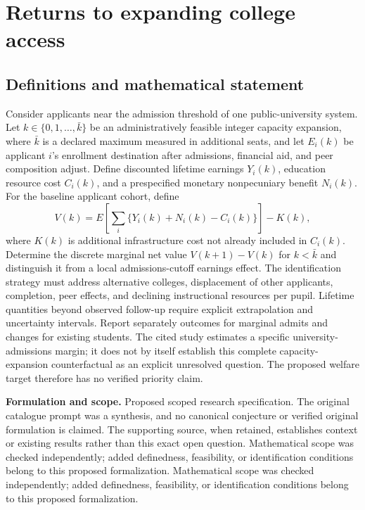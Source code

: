 \documentclass[11pt]{article}
\begin{document}
\section*{Returns to expanding college access}\label{30007736}
\subsection{Definitions and mathematical statement}
Consider applicants near the admission threshold of one public-university system. Let \(k\in\{0,1,\ldots,\bar k\}\) be an administratively feasible integer capacity expansion, where \(\bar k\) is a declared maximum measured in additional seats, and let \(E_i(k)\) be applicant \(i\)'s enrollment destination after admissions, financial aid, and peer composition adjust. Define discounted lifetime earnings \(Y_i(k)\), education resource cost \(C_i(k)\), and a prespecified monetary nonpecuniary benefit \(N_i(k)\). For the baseline applicant cohort, define
\[V(k)=E\!\left[\sum_i\{Y_i(k)+N_i(k)-C_i(k)\}\right]-K(k),\]
where \(K(k)\) is additional infrastructure cost not already included in \(C_i(k)\). Determine the discrete marginal net value \(V(k+1)-V(k)\) for \(k<\bar k\) and distinguish it from a local admissions-cutoff earnings effect. The identification strategy must address alternative colleges, displacement of other applicants, completion, peer effects, and declining instructional resources per pupil. Lifetime quantities beyond observed follow-up require explicit extrapolation and uncertainty intervals. Report separately outcomes for marginal admits and changes for existing students. The cited study estimates a specific university-admissions margin; it does not by itself establish this complete capacity-expansion counterfactual as an explicit unresolved question. The proposed welfare target therefore has no verified priority claim.

\par\textbf{Formulation and scope.} Proposed scoped research specification. The original catalogue prompt was a synthesis, and no canonical conjecture or verified original formulation is claimed. The supporting source, when retained, establishes context or existing results rather than this exact open question. Mathematical scope was checked independently; added definedness, feasibility, or identification conditions belong to this proposed formalization. Mathematical scope was checked independently; added definedness, feasibility, or identification conditions belong to this proposed formalization.
\end{document}
